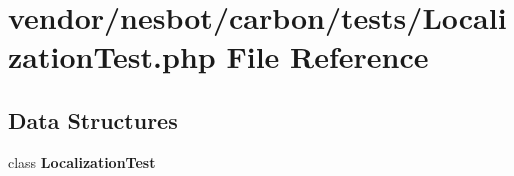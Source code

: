 \section{vendor/nesbot/carbon/tests/\+Localization\+Test.php File Reference}
\label{_localization_test_8php}
\subsection*{Data Structures}
\begin{DoxyCompactItemize}
\item 
class {\bf Localization\+Test}
\end{DoxyCompactItemize}
